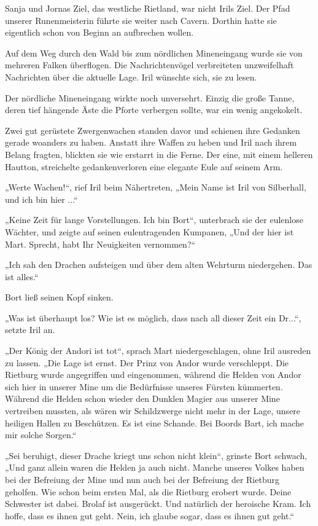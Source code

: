 Sanja und Jornas Ziel, das westliche Rietland, war nicht Irils Ziel. Der Pfad unserer Runenmeisterin führte sie weiter nach Cavern. Dorthin hatte sie eigentlich schon von Beginn an aufbrechen wollen.

Auf dem Weg durch den Wald bis zum nördlichen Mineneingang wurde sie von mehreren Falken überflogen. Die Nachrichtenvögel verbreiteten unzweifelhaft Nachrichten über die aktuelle Lage. Iril wünschte sich, sie zu lesen.

Der nördliche Mineneingang wirkte noch unversehrt. Einzig die große Tanne, deren tief hängende Äste die Pforte verbergen sollte, war ein wenig angekokelt.

Zwei gut gerüstete Zwergenwachen standen davor und schienen ihre Gedanken gerade woanders zu haben. Anstatt ihre Waffen zu heben und Iril nach ihrem Belang fragten, blickten sie wie erstarrt in die Ferne. Der eine, mit einem helleren Hautton, streichelte gedankenverloren eine elegante Eule auf seinem Arm.

„Werte Wachen!“, rief Iril beim Nähertreten, „Mein Name ist Iril von Silberhall, und ich bin hier ...“

„Keine Zeit für lange Vorstellungen. Ich bin Bort“, unterbrach sie der eulenlose Wächter, und zeigte auf seinen eulentragenden Kumpanen, „Und der hier ist Mart. Sprecht, habt Ihr Neuigkeiten vernommen?“

„Ich sah den Drachen aufsteigen und über dem alten Wehrturm niedergehen. Das ist alles.“

Bort ließ seinen Kopf sinken.

„Was ist überhaupt los? Wie ist es möglich, dass nach all dieser Zeit ein Dr...“, setzte Iril an.

„Der König der Andori ist tot“, sprach Mart niedergeschlagen, ohne Iril ausreden zu lassen. „Die Lage ist ernst. Der Prinz von Andor wurde verschleppt. Die Rietburg wurde angegriffen und eingenommen, während die Helden von Andor sich hier in unserer Mine um die Bedürfnisse unseres Fürsten kümmerten. Während die Helden schon wieder den Dunklen Magier aus unserer Mine vertreiben mussten, als wären wir Schildzwerge nicht mehr in der Lage, unsere heiligen Hallen zu Beschützen. Es ist eine Schande. Bei Boords Bart, ich mache mir solche Sorgen.“

„Sei beruhigt, dieser Drache kriegt uns schon nicht klein“, grinste Bort schwach, „Und ganz allein waren die Helden ja auch nicht. Manche unseres Volkes haben bei der Befreiung der Mine und nun auch bei der Befreiung der Rietburg geholfen. Wie schon beim ersten Mal, als die Rietburg erobert wurde. Deine Schwester ist dabei. Brolaf ist ausgerückt. Und natürlich der heroische Kram. Ich hoffe, dass es ihnen gut geht. Nein, ich glaube sogar, dass es ihnen gut geht.“

